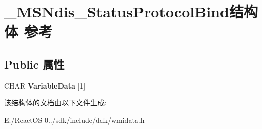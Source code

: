 \hypertarget{struct___m_s_ndis___status_protocol_bind}{}\section{\+\_\+\+M\+S\+Ndis\+\_\+\+Status\+Protocol\+Bind结构体 参考}
\label{struct___m_s_ndis___status_protocol_bind}
\subsection*{Public 属性}
\begin{DoxyCompactItemize}
\item 
\mbox{\label{struct___m_s_ndis___status_protocol_bind_aa844107a36c15814fbb40ab1c4d2b80c}} 
C\+H\+AR {\bfseries Variable\+Data} \mbox{[}1\mbox{]}
\end{DoxyCompactItemize}


该结构体的文档由以下文件生成\+:\begin{DoxyCompactItemize}
\item 
E\+:/\+React\+O\+S-\/0../sdk/include/ddk/wmidata.\+h\end{DoxyCompactItemize}
